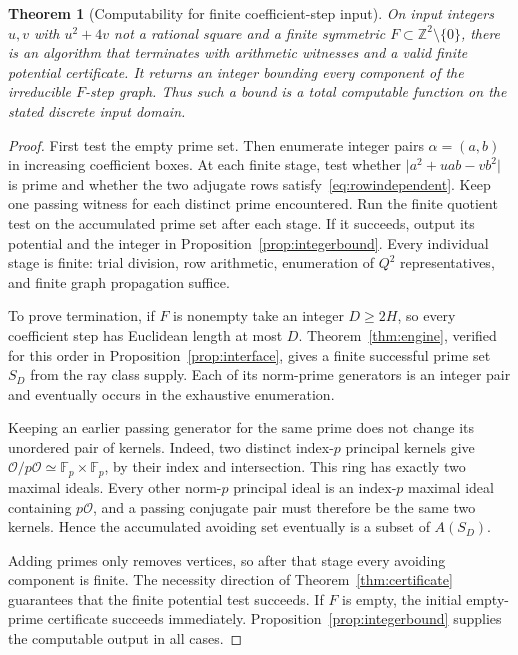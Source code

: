 \documentclass[11pt]{article}
\numberwithin{equation}{section}
\newtheorem{theorem}{Theorem}[section]
\theoremstyle{definition}\newtheorem{definition}[theorem]{Definition}
\theoremstyle{remark}\newtheorem{remark}[theorem]{Remark}
\newcommand{\Z}{\mathbb Z}\newcommand{\Q}{\mathbb Q}\newcommand{\R}{\mathbb R}
\newcommand{\F}{\mathbb F}\newcommand{\C}{\mathbb C}
\newcommand{\OO}{\mathcal O}\newcommand{\PP}{\mathcal P}
\newcommand{\abs}[1]{\lvert #1\rvert}
\begin{document}
\begin{theorem}[Computability for finite coefficient-step input]\label{thm:computable}
On input integers $u,v$ with $u^2+4v$ not a rational square and a finite symmetric $F\subset\Z^2\setminus\{0\}$, there is an algorithm that terminates with arithmetic witnesses and a valid finite potential certificate. It returns an integer bounding every component of the irreducible $F$-step graph. Thus such a bound is a total computable function on the stated discrete input domain.
\end{theorem}
\begin{proof}
First test the empty prime set. Then enumerate integer pairs $\alpha=(a,b)$ in increasing coefficient boxes. At each finite stage, test whether $\abs{a^2+uab-vb^2}$ is prime and whether the two adjugate rows satisfy~\eqref{eq:rowindependent}. Keep one passing witness for each distinct prime encountered. Run the finite quotient test on the accumulated prime set after each stage. If it succeeds, output its potential and the integer in Proposition~\ref{prop:integerbound}. Every individual stage is finite: trial division, row arithmetic, enumeration of $Q^2$ representatives, and finite graph propagation suffice.

To prove termination, if $F$ is nonempty take an integer $D\ge2H$, so every coefficient step has Euclidean length at most $D$. Theorem~\ref{thm:engine}, verified for this order in Proposition~\ref{prop:interface}, gives a finite successful prime set $S_D$ from the ray class supply. Each of its norm-prime generators is an integer pair and eventually occurs in the exhaustive enumeration.

Keeping an earlier passing generator for the same prime does not change its unordered pair of kernels. Indeed, two distinct index-$p$ principal kernels give
$\OO/p\OO\simeq\F_p\times\F_p$, by their index and intersection. This ring has exactly two maximal ideals. Every other norm-$p$ principal ideal is an index-$p$ maximal ideal containing $p\OO$, and a passing conjugate pair must therefore be the same two kernels. Hence the accumulated avoiding set eventually is a subset of $A(S_D)$.

Adding primes only removes vertices, so after that stage every avoiding component is finite. The necessity direction of Theorem~\ref{thm:certificate} guarantees that the finite potential test succeeds. If $F$ is empty, the initial empty-prime certificate succeeds immediately. Proposition~\ref{prop:integerbound} supplies the computable output in all cases.
\end{proof}
\end{document}
